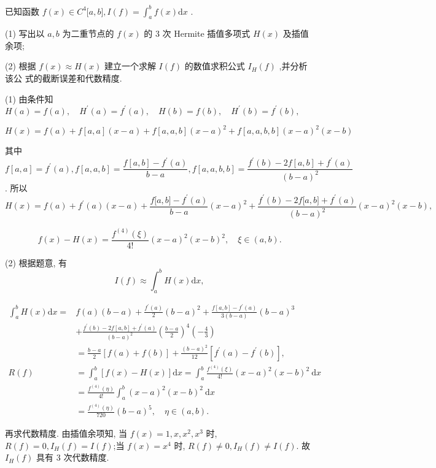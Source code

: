 \begin{tcolorbox}[enhanced,colback=10,colframe=9,breakable,coltitle=green!25!black,title=2024]
已知函数 $f(x) {\in} C^{4}\lbrack a,b\rbrack,I(f) = \displaystyle\int_{a}^{b}f(x)\mathrm{d}x$ .

(1) 写出以 $a,b$ 为二重节点的 $f(x)$ 的 3 次 Hermite 插值多项式 $H(x)$ 及插值 余项;

(2) 根据 $f(x) {\approx} H(x)$ 建立一个求解 $I(f)$ 的数值求积公式 $I_{H}(f)$ ,并分析该公 式的截断误差和代数精度.
\tcblower


 (1) 由条件知$H(a) = f(a),\quad H^{{\prime}}(a) = f^{{\prime}}(a),\quad H(b) = f(b),\quad H^{{\prime}}(b) = f^{{\prime}}(b),$ 

$$H(x) = f(a) +f[a,a](x-a)+f[a,a,b](x-a)^2+f[a,a,b,b](x-a)^2(x-b)$$

其中$f[a,a]=f^{{\prime}}(a),f[a,a,b]=\dfrac{f[a,b]-f^{\prime}(a)}{b-a},f[a,a,b,b]= \dfrac{f^{{\prime}}(b) - 2f[ a,b]+f^{\prime}(a)}{(b-a)^2}$. 所以
$$H(x) = f(a) + f^{{\prime}}(a)(x {-} a) + \frac{f\lbrack a,b\rbrack {-} f^{{\prime}}(a)}{b {-} a}{(x {-} a)}^{2} + \frac{f^{\prime}(b) {-} 2f\lbrack a,b\rbrack + f^{\prime}(a)}{{(b - a)}^{2}}{(x {-} a)}^{2}(x {-} b),$$

$$f(x) {-} H(x) = \frac{f^{(4)}(\xi)}{4!}{(x {-} a)}^{2}{(x {-} b)}^{2},\quad\xi {\in} (a,b).$$

(2) 根据题意, 有
$$I(f) {\approx} {{\int}}_{a}^{b}H(x)\mathrm{d}x,$$

$$
\begin{aligned}
 \int_{a}^{b} H(x) \mathrm{d} x= & f(a)(b-a)+\frac{f^{\prime}(a)}{2}(b-a)^{2}+\frac{f[a, b]-f^{\prime}(a)}{3(b-a)}(b-a)^{3} \\ & +\frac{f^{\prime}(b)-2 f[a, b]+f^{\prime}(a)}{(b-a)^{2}}\left(\frac{b-a}{2}\right)^{4}\left(-\frac{4}{3}\right)\\
& =\frac{b-a}{2}[f(a)+f(b)]+\frac{(b-a)^{2}}{12}\left[f^{\prime}(a)-f^{\prime}(b)\right], \\
R(f)&=  \int_{a}^{b}[f(x)-H(x)] \mathrm{d} x=\int_{a}^{b} \frac{f^{(4)}(\xi)}{4!}(x-a)^{2}(x-b)^{2} \mathrm{~d} x \\
&=  \frac{f^{(4)}(\eta)}{4!} \int_{a}^{b}(x-a)^{2}(x-b)^{2} \mathrm{~d} x \\
&=  \frac{f^{(4)}(\eta)}{720}(b-a)^{5}, \quad \eta \in(a, b) .
\end{aligned}
$$

再求代数精度. 由插值余项知, 当 $ f(x)=1, x, x^{2}, x^{3} $ 时, $ R(f)=0, I_{H}(f)=I(f) $;当 $ f(x)=x^{4} $ 时, $ R(f) \neq 0, I_{H}(f) \neq I(f) $. 故 $ I_{H}(f) $ 具有 3 次代数精度.
\end{tcolorbox}

